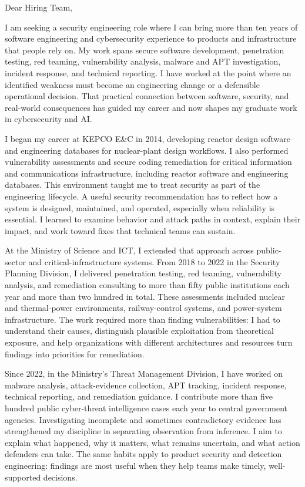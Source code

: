 \documentclass[12pt]{article}
\begin{document}
\onehalfspacing

Dear Hiring Team,

I am seeking a security engineering role where I can bring more than ten years of software engineering and cybersecurity experience to products and infrastructure that people rely on. My work spans secure software development, penetration testing, red teaming, vulnerability analysis, malware and APT investigation, incident response, and technical reporting. I have worked at the point where an identified weakness must become an engineering change or a defensible operational decision. That practical connection between software, security, and real-world consequences has guided my career and now shapes my graduate work in cybersecurity and AI.

I began my career at KEPCO E\&C in 2014, developing reactor design software and engineering databases for nuclear-plant design workflows. I also performed vulnerability assessments and secure coding remediation for critical information and communications infrastructure, including reactor software and engineering databases. This environment taught me to treat security as part of the engineering lifecycle. A useful security recommendation has to reflect how a system is designed, maintained, and operated, especially when reliability is essential. I learned to examine behavior and attack paths in context, explain their impact, and work toward fixes that technical teams can sustain.

At the Ministry of Science and ICT, I extended that approach across public-sector and critical-infrastructure systems. From 2018 to 2022 in the Security Planning Division, I delivered penetration testing, red teaming, vulnerability analysis, and remediation consulting to more than fifty public institutions each year and more than two hundred in total. These assessments included nuclear and thermal-power environments, railway-control systems, and power-system infrastructure. The work required more than finding vulnerabilities: I had to understand their causes, distinguish plausible exploitation from theoretical exposure, and help organizations with different architectures and resources turn findings into priorities for remediation.

Since 2022, in the Ministry's Threat Management Division, I have worked on malware analysis, attack-evidence collection, APT tracking, incident response, technical reporting, and remediation guidance. I contribute more than five hundred public cyber-threat intelligence cases each year to central government agencies. Investigating incomplete and sometimes contradictory evidence has strengthened my discipline in separating observation from inference. I aim to explain what happened, why it matters, what remains uncertain, and what action defenders can take. The same habits apply to product security and detection engineering: findings are most useful when they help teams make timely, well-supported decisions.
\end{document}
